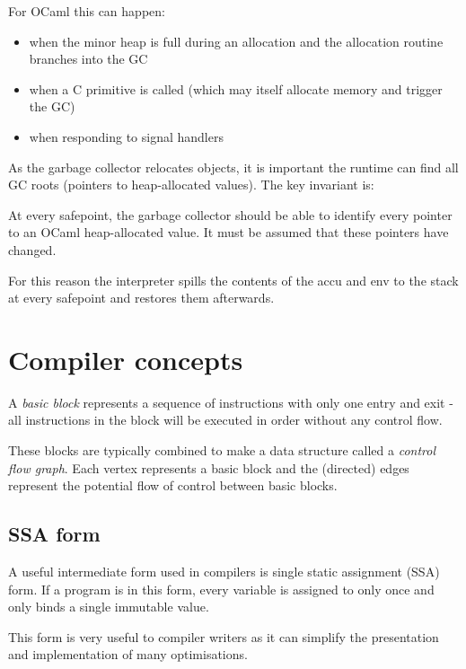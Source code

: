 For OCaml this can happen:

\begin{itemize}
    \item when the minor heap is full during an allocation and the allocation routine branches
          into the GC
    \item when a C primitive is called	(which may itself allocate memory and trigger the
          GC)
    \item when responding to signal handlers
\end{itemize}

As the garbage collector relocates objects, it is important the runtime can find all GC roots
(pointers to heap-allocated values). The key invariant is:

\begin{framed}
    At every safepoint, the garbage collector should be able to identify every pointer to an OCaml
    heap-allocated value. It must be assumed that these pointers have changed.
\end{framed}

For this reason the interpreter spills the contents of the accu and env to the stack at every
safepoint and restores them afterwards.

\section{Compiler concepts}

A \emph{basic block} represents a sequence of instructions with only one entry and exit - all
instructions
in the block will be executed in order without any control flow.

These blocks are typically combined to make a data structure called a \emph{control flow graph}.
Each vertex represents a basic block and the (directed) edges represent the potential flow of
control between basic blocks.

\subsection{SSA form}

A useful intermediate form used in compilers is single static assignment (SSA) form. If a program
is in this form,
every variable is assigned to only once and only binds a single immutable value.

This form is very useful to compiler writers as it can simplify the presentation and implementation
of many optimisations.

